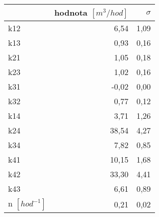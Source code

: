 \begin{tabular}{lrr}
\toprule
{} &  hodnota $\left[\si{m^3/hod}\right]$ &  $\sigma$ \\
\midrule
k12                 &                                 6,54 &      1,09 \\
k13                 &                                 0,93 &      0,16 \\
k21                 &                                 1,05 &      0,18 \\
k23                 &                                 1,02 &      0,16 \\
k31                 &                                -0,02 &      0,00 \\
k32                 &                                 0,77 &      0,12 \\
k14                 &                                 3,71 &      1,26 \\
k24                 &                                38,54 &      4,27 \\
k34                 &                                 7,82 &      0,85 \\
k41                 &                                10,15 &      1,68 \\
k42                 &                                33,30 &      4,41 \\
k43                 &                                 6,61 &      0,89 \\
n $[\si{hod^{-1}}]$ &                                 0,21 &      0,02 \\
\bottomrule
\end{tabular}
